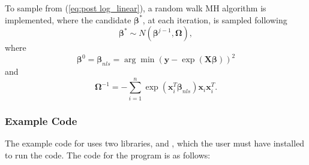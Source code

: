 \documentclass[article]{jss}
\begin{document}
To sample from (\ref{eq:post log_linear}), a random walk MH algorithm
is implemented, where the candidate $\bm{\beta}^{*}$, at each
iteration, is sampled following \begin{equation} \bm{\beta}^{*}\sim
  N\left(\bm{\beta}^{j-1},\bm{\Omega}\right),\label{eq:candidate
    log-linear}\end{equation} where\[
\bm{\beta}^{0}=\bm{\beta}_{nls}=\arg\min\left(\bm{y}-\exp\left(\bm{X}\bm{\beta}\right)\right)^{2}\]
and\[
\bm{\Omega}^{-1}=-\sum_{i=1}^{n}\exp\left(\bm{x}_{i}^{T}\bm{\beta}_{nls}\right)\bm{x}_{i}\bm{x}_{i}^{T}.\]



\subsubsection{Example Code}

The example code for  uses two 
libraries,  and , which the user must have
installed to run the code.  The code for the program
is as follows:
\end{document}
